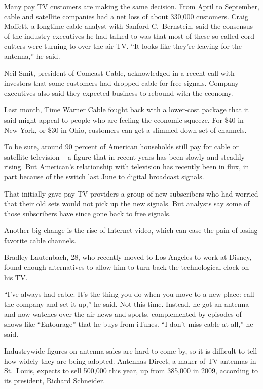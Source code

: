 ﻿\documentclass[12pt]{article}
\begin{document}
Many pay TV customers are making the same decision. From April to September, cable and satellite
companies had a net loss of about 330,000 customers. Craig Moffett, a longtime cable analyst with
Sanford C.~Bernstein, said the consensus of the industry executives he had talked to was that most
of these so-called cord-cutters were turning to over-the-air TV. ``It looks like they're leaving for
the antenna,'' he said.

Neil Smit, president of Comcast Cable, acknowledged in a recent call with investors that some
customers had dropped cable for free signals. Company executives also said they expected business to
rebound with the economy.

Last month, Time Warner Cable fought back with a lower-cost package that it said might appeal to
people who are feeling the economic squeeze. For \$40 in New York, or \$30 in Ohio, customers can
get a slimmed-down set of channels.

To be sure, around 90 percent of American households still pay for cable or satellite television --
a figure that in recent years has been slowly and steadily rising. But American's relationship with
television has recently been in flux, in part because of the switch last June to digital broadcast
signals.

That initially gave pay TV providers a group of new subscribers who had worried that their old sets
would not pick up the new signals. But analysts say some of those subscribers have since gone back
to free signals.

Another big change is the rise of Internet video, which can ease the pain of losing favorite cable
channels.

Bradley Lautenbach, 28, who recently moved to Los Angeles to work at Disney, found enough
alternatives to allow him to turn back the technological clock on his TV.

``I've always had cable. It's the thing you do when you move to a new place: call the company and
set it up,'' he said. Not this time. Instead, he got an antenna and now watches over-the-air news
and sports, complemented by episodes of shows like ``Entourage'' that he buys from iTunes. ``I don't
miss cable at all,'' he said.

Industrywide figures on antenna sales are hard to come by, so it is difficult to tell how widely
they are being adopted. Antennas Direct, a maker of TV antennas in St.~Louis, expects to sell
500,000 this year, up from 385,000 in 2009, according to its president, Richard Schneider.
\end{document}
